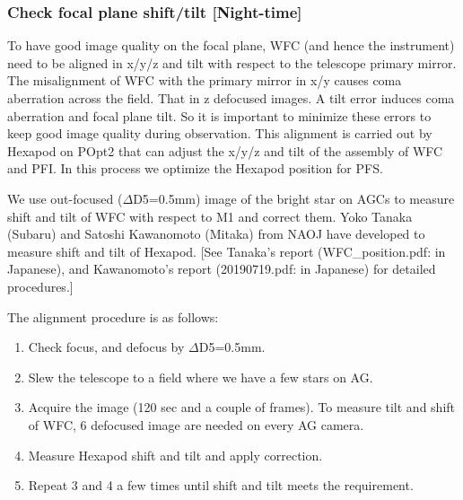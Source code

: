 \subsubsection{Check focal plane shift/tilt [Night-time]}\label{secflow:WFCTiltShift}

To have good image quality on the focal plane, WFC (and hence the instrument) need to be aligned in x/y/z and tilt with respect to the telescope primary mirror.
The misalignment of WFC with the primary mirror in x/y causes coma aberration across the field.
That in z defocused images.
A tilt error induces coma aberration and focal plane tilt.
So it is important to minimize these errors to keep good image quality during observation. 
This alignment is carried out by Hexapod on POpt2 that can adjust the x/y/z and tilt of the assembly of WFC and PFI.
In this process we optimize the Hexapod position for PFS.

We use out-focused ($\Delta$D5=0.5mm) image of the bright star on AGCs to measure shift and tilt of WFC with respect to M1 and correct them.
Yoko Tanaka (Subaru) and Satoshi Kawanomoto (Mitaka) from NAOJ have developed to measure shift and tilt of Hexapod.
[See Tanaka's report (WFC\_position.pdf: in Japanese), and Kawanomoto's report (20190719.pdf: in Japanese) for detailed procedures.]


The alignment procedure is as follows:
\begin{enumerate}
\item Check focus, and defocus by $\Delta$D5=0.5mm.
\item Slew the telescope to a field where we have a few stars on AG.
\item Acquire the image (120 sec and a couple of frames).
To measure tilt and shift of WFC, 6 defocused image are needed on every AG camera.
\item Measure Hexapod shift and tilt and apply correction.
\item Repeat 3 and 4 a few times until shift and tilt meets the requirement.
\end{enumerate}

